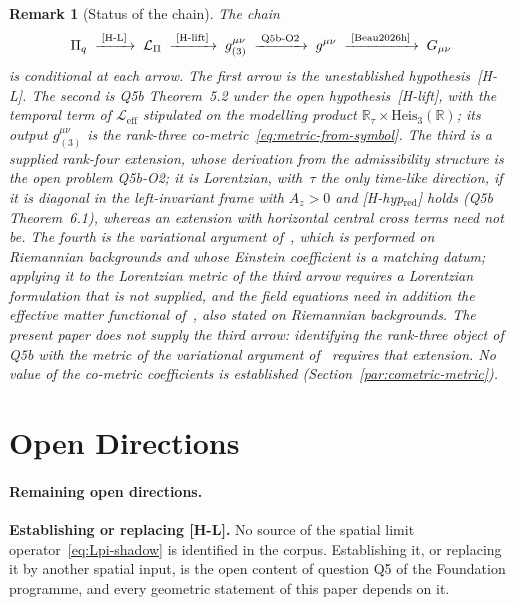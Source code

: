 \documentclass[11pt,a4paper]{article}
\newtheorem{remark}[theorem]{Remark}
\begin{document}
  \begin{remark}[Status of the chain]
    \label{rem:chain}
    The chain
    \begin{equation}
      \label{eq:chain}
      \Pi_q
      \;\xrightarrow{\;[\mathrm{H\text{-}L}]\;}\;
      \mathcal{L}_\Pi
      \;\xrightarrow{\;[\mathrm{H\text{-}lift}]\;}\;
      g^{\mu\nu}_{(3)}
      \;\xrightarrow{\;\text{Q5b-O2}\;}\;
      g^{\mu\nu}
      \;\xrightarrow{\;\text{\cite{Beau2026h}}\;}\;
      G_{\mu\nu}
    \end{equation}
    is conditional at each arrow.
    The first arrow is the unestablished hypothesis~[H-L].
    The second is Q5b Theorem~5.2 under the open hypothesis~[H-lift], with the temporal term of
    $\mathcal{L}_{\mathrm{eff}}$ stipulated on the modelling product
    $\mathbb{R}_\tau \times \mathrm{Heis}_3(\mathbb{R})$; its output $g^{\mu\nu}_{(3)}$ is the rank-three
    co-metric~\eqref{eq:metric-from-symbol}.
    The third is a supplied rank-four extension, whose derivation from the admissibility structure is the open problem
    Q5b-O2; it is Lorentzian, with~$\tau$ the only time-like direction, if it is diagonal in the left-invariant frame
    with $A_z > 0$ and [H-hyp$_{\mathrm{red}}$] holds (Q5b Theorem~6.1), whereas an extension with horizontal\textendash
    central cross terms need not be.
    The fourth is the variational argument of~\cite{Beau2026h}, which is performed on Riemannian backgrounds and whose
    Einstein coefficient is a matching datum; applying it to the Lorentzian metric of the third arrow requires a
    Lorentzian formulation that is not supplied, and the field equations need in addition the effective matter
    functional of~\cite{Beau2026Thermodynamics}, also stated on Riemannian backgrounds.
    The present paper does not supply the third arrow: identifying the rank-three object of Q5b with the metric of the
    variational argument of~\cite{Beau2026h} requires that extension.
    No value of the co-metric coefficients is established (Section~\ref{par:cometric-metric}).
  \end{remark}

  \clearpage

  \section{Open Directions}
  \label{sec:open}

  \paragraph{Remaining open directions.}
    \textbf{Establishing or replacing [H-L].}
    No source of the spatial limit operator~\eqref{eq:Lpi-shadow} is identified in the corpus.
    Establishing it, or replacing it by another spatial input, is the open content of question Q5 of the Foundation
    programme, and every geometric statement of this paper depends on it.
\end{document}
